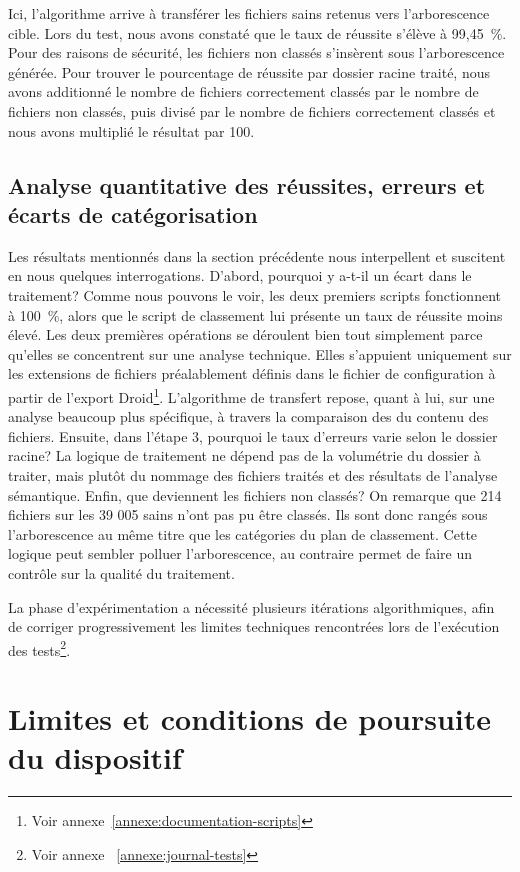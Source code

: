 Ici, l'algorithme arrive à transférer les fichiers sains retenus vers l'arborescence cible. Lors du test, nous avons constaté que le taux de réussite s'élève à 99,45~\%. Pour des raisons de sécurité, les fichiers non classés s'insèrent sous l'arborescence générée. Pour trouver le pourcentage de réussite par dossier racine traité, nous avons additionné le nombre de fichiers correctement classés par le nombre de fichiers non classés, puis divisé par le nombre de fichiers correctement classés et nous avons multiplié le résultat par 100.


\subsection*{Analyse quantitative des réussites, erreurs et écarts de catégorisation}

Les résultats mentionnés dans la section précédente nous interpellent et suscitent en nous quelques interrogations. D'abord, pourquoi y a-t-il un écart dans le traitement? Comme nous pouvons le voir, les deux premiers scripts fonctionnent à 100~\%, alors que le script de classement lui présente un taux de réussite moins élevé. Les deux premières opérations se déroulent bien tout simplement parce qu'elles se concentrent sur une analyse technique. Elles s'appuient uniquement sur les extensions de fichiers préalablement définis dans le fichier de configuration à partir de l'export Droid\footnote{Voir annexe~\ref{annexe:documentation-scripts}}. L’algorithme de transfert repose, quant à lui, sur une analyse beaucoup plus spécifique, à travers la comparaison des du contenu des fichiers. Ensuite, dans l'étape 3, pourquoi le taux d'erreurs varie selon le dossier racine? La logique de traitement ne dépend pas de la volumétrie du dossier à traiter, mais plutôt du nommage des fichiers traités et des résultats de l'analyse sémantique. Enfin, que deviennent les fichiers non classés? On remarque que 214 fichiers sur les 39 005 sains n'ont pas pu être classés. Ils sont donc rangés sous l'arborescence au même titre que les catégories du plan de classement. Cette logique peut sembler polluer l'arborescence, au contraire permet de faire un contrôle sur la qualité du traitement.

La phase d'expérimentation a nécessité plusieurs itérations algorithmiques, afin de corriger progressivement les limites techniques rencontrées lors de l'exécution des tests\footnote{Voir annexe ~\ref{annexe:journal-tests}}.

\section{Limites et conditions de poursuite du dispositif}

